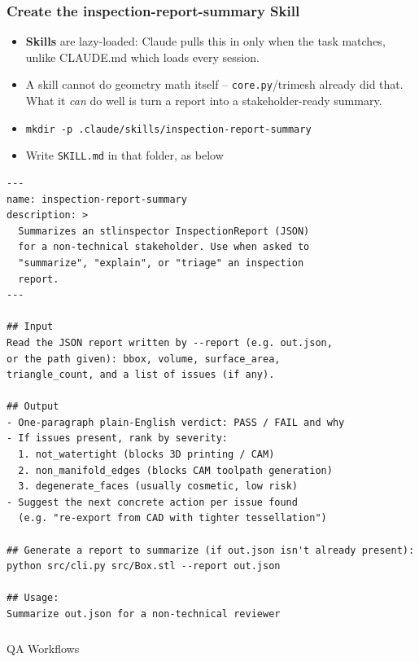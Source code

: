 \begin{frame}[fragile]\frametitle{Create the inspection-report-summary Skill}

  \begin{itemize}
	\item \textbf{Skills} are lazy-loaded: Claude pulls this in only when the task matches, unlike CLAUDE.md which loads every session.
	\item A skill cannot do geometry math itself -- \texttt{core.py}/trimesh already did that. What it \textit{can} do well is turn a report into a stakeholder-ready summary.
	\item \lstinline|mkdir -p .claude/skills/inspection-report-summary|
	\item Write \lstinline|SKILL.md| in that folder, as below
  \end{itemize}


\begin{lstlisting}
---
name: inspection-report-summary
description: >
  Summarizes an stlinspector InspectionReport (JSON)
  for a non-technical stakeholder. Use when asked to
  "summarize", "explain", or "triage" an inspection
  report.
---

## Input
Read the JSON report written by --report (e.g. out.json,
or the path given): bbox, volume, surface_area,
triangle_count, and a list of issues (if any).

## Output
- One-paragraph plain-English verdict: PASS / FAIL and why
- If issues present, rank by severity:
  1. not_watertight (blocks 3D printing / CAM)
  2. non_manifold_edges (blocks CAM toolpath generation)
  3. degenerate_faces (usually cosmetic, low risk)
- Suggest the next concrete action per issue found
  (e.g. "re-export from CAD with tighter tessellation")

## Generate a report to summarize (if out.json isn't already present):
python src/cli.py src/Box.stl --report out.json

## Usage:
Summarize out.json for a non-technical reviewer
\end{lstlisting}
\end{frame}


\begin{frame}[fragile]\frametitle{}
\begin{center}
{\Large QA Workflows}
\end{center}
\end{frame}


